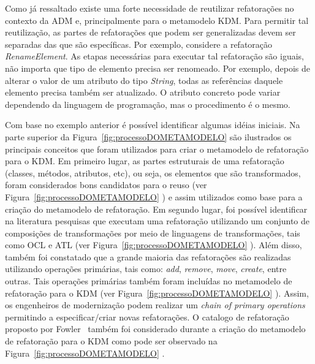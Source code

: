 Como já ressaltado existe uma forte necessidade de reutilizar refatorações no contexto da ADM e, principalmente para o metamodelo KDM. Para permitir tal reutilização, as partes de refatorações que podem ser generalizadas devem ser separadas das que são específicas. Por exemplo, considere a refatoração \textit{RenameElement}. As etapas necessárias para executar tal refatoração são iguais, não importa que tipo de elemento precisa ser renomeado. Por exemplo, depois de alterar o valor de um atributo do tipo \textit{String}, todas as referências daquele elemento precisa também ser atualizado. O atributo concreto pode variar dependendo da linguagem de programação, mas o procedimento é o mesmo.	

Com base no exemplo anterior é possível identificar algumas idéias iniciais. Na parte superior da Figura~\ref{fig:processoDOMETAMODELO} são ilustrados os principais conceitos que foram utilizados para criar o metamodelo de refatoração para o KDM. Em primeiro lugar, as partes estruturais de uma refatoração (classes, métodos, atributos, etc), ou seja, os elementos que são transformados, foram considerados bons candidatos para o reuso (ver Figura~\ref{fig:processoDOMETAMODELO} ) e assim utilizados como base para a criação do metamodelo de refatoração. Em segundo lugar, foi possível identificar na literatura pesquisas que executam uma refatoração utilizando um conjunto de composições de transformações por meio de linguagens de transformações, tais como OCL e ATL (ver Figura~\ref{fig:processoDOMETAMODELO} ). Além disso, também foi constatado que a grande maioria das refatorações são realizadas utilizando operações primárias, tais como: \textit{add}, \textit{remove}, \textit{move}, \textit{create}, entre outras. Tais operações primárias também foram incluídas no metamodelo de refatoração para o KDM (ver Figura~\ref{fig:processoDOMETAMODELO} ). Assim, os engenheiros de modernização podem realizar um \textit{chain of primary operations} permitindo a especificar/criar novas refatorações. O catalogo de refatoração proposto por Fowler~\citep{refactImpro} também foi considerado durante a criação do metamodelo de refatoração para o KDM como pode ser observado na Figura~\ref{fig:processoDOMETAMODELO} .




\FloatBarrier


